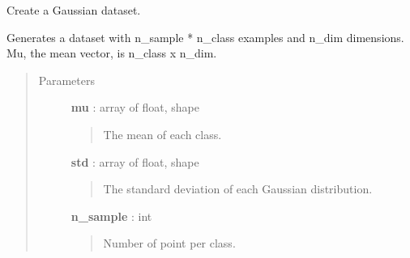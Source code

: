 \documentclass[letterpaper,10pt,english]{sphinxmanual}
\begin{document}
\begin{fulllineitems}
\label{index:adenine.utils.data_source.MixGauss}
Create a Gaussian dataset.

Generates a dataset with n\_sample * n\_class examples and n\_dim dimensions. Mu, the mean vector, is n\_class x n\_dim.
\begin{quote}\begin{description}
\item[{Parameters}] \leavevmode
\textbf{mu} : array of float, shape
\begin{quote}

The mean of each class.
\end{quote}

\textbf{std} :  array of float, shape
\begin{quote}

The standard deviation of each Gaussian distribution.
\end{quote}

\textbf{n\_sample} : int
\begin{quote}

Number of point per class.
\end{quote}

\end{description}\end{quote}

\end{fulllineitems}

\end{document}

